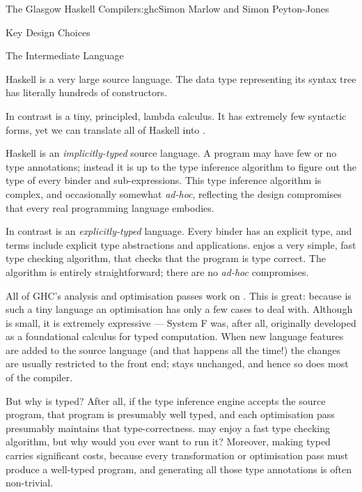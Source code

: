 \begin{aosachapter}{The Glasgow Haskell Compiler}{s:ghc}{Simon Marlow and Simon Peyton-Jones}
\begin{aosasect1}{Key Design Choices}
\begin{aosasect2}{The Intermediate Language}
\begin{aosaitemize}

\item Haskell is a very large source language.  The data type
  representing its syntax tree has literally hundreds of constructors.

  In contrast  is a tiny, principled, lambda calculus.  It
  has extremely few syntactic forms, yet we can translate all of
  Haskell into .

\item Haskell is an \emph{implicitly-typed} source language.  A
  program may have few or no type annotations; instead it is up to the
  type inference algorithm to figure out the type of every binder and
  sub-expressions.  This type inference algorithm is complex, and
  occasionally somewhat \emph{ad-hoc}, reflecting the design
  compromises that every real programming language embodies.

  In contrast  is an \emph{explicitly-typed} language.
  Every binder has an explicit type, and terms include explicit type
  abstractions and applications.   enjos a very simple,
  fast type checking algorithm, that checks that the program is type
  correct.  The algorithm is entirely straightforward; there are no
  \emph{ad-hoc} compromises.

\end{aosaitemize}

All of GHC's analysis and optimisation passes work on
. This is great: because  is such a tiny
language an optimisation has only a few cases to deal with.  Although
 is small, it is extremely expressive --- System F was,
after all, originally developed as a foundational calculus for typed
computation.  When new language features are added to the source
language (and that happens all the time!) the changes are usually
restricted to the front end;  stays unchanged, and hence so
does most of the compiler.

But why is  typed?  After all, if the type inference engine
accepts the source program, that program is presumably well typed, and
each optimisation pass presumably maintains that type-correctness.
 may enjoy a fast type checking algorithm, but why would
you ever want to run it?  Moreover, making  typed carries
significant costs, because every transformation or optimisation pass
must produce a well-typed program, and generating all those type
annotations is often non-trivial.


\end{aosasect2}
\end{aosasect1}
\end{aosachapter}
